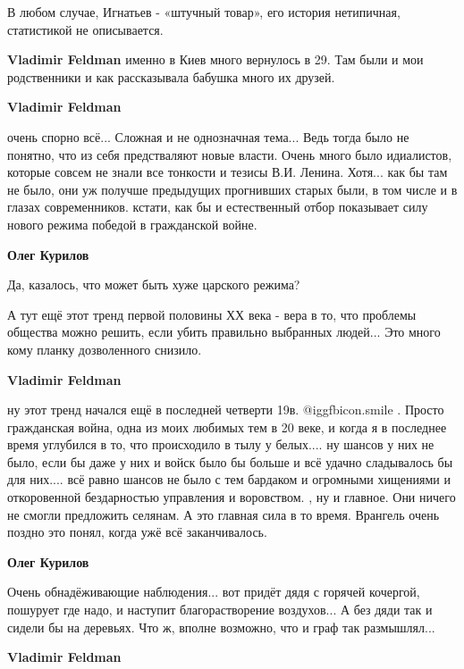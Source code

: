 \begin{itemize}
\begin{itemize}
\begin{itemize}
В любом случае, Игнатьев - «штучный товар», его история нетипичная, статистикой
не описывается.

\textbf{Vladimir Feldman} именно в Киев много вернулось в 29. Там были и мои родственники и как рассказывала бабушка много их друзей.
\end{itemize} %

\textbf{Vladimir Feldman} 

очень спорно всё... Сложная и не однозначная тема... Ведь тогда было не
понятно, что из себя предстваляют новые власти. Очень много было идиалистов,
которые совсем не знали все тонкости и тезисы В.И. Ленина. Хотя... как бы там
не было, они уж получше предыдущих прогнивших старых были, в том числе и в
глазах современников. кстати, как бы и естественный отбор показывает силу
нового режима победой в гражданской войне.

\begin{itemize} %
\textbf{Олег Курилов} 

Да, казалось, что может быть хуже царского режима?

А тут ещё этот тренд первой половины ХХ века - вера в то, что проблемы общества
можно решить, если убить правильно выбранных людей... Это много кому планку
дозволенного снизило.

\textbf{Vladimir Feldman} 

ну этот тренд начался ещё в последней четверти 19в.  @igg{fbicon.smile} .
Просто гражданская война, одна из моих любимых тем в 20 веке, и когда я в
последнее время углубился в то, что происходило в тылу у белых.... ну шансов у
них не было, если бы даже у них и войск было бы больше и всё удачно сладывалось
бы для них.... всё равно шансов не было с тем бардаком и огромными хищениями и
откоровенной бездарностью управления и воровством. , ну и главное. Они ничего
не смогли предложить селянам. А это главная сила в то время. Врангель очень
поздно это понял, когда ужё всё заканчивалось.

\textbf{Олег Курилов} 

Очень обнадёживающие наблюдения... вот придёт дядя с горячей кочергой, пошурует
где надо, и наступит благорастворение воздухов... А без дяди так и сидели бы на
деревьях. Что ж, вполне возможно, что и граф так размышлял...

\end{itemize} %

\textbf{Vladimir Feldman} 


\end{itemize}
\end{itemize}
